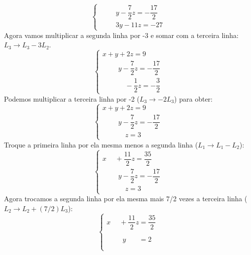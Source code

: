 \begin{exemplos}
\begin{solucao}
\begin{enumerate}
\[\begin{cases}
                                \phantom{2x +} y - \dfrac{7}{2}z = -\dfrac{17}{2}\\
                                \phantom{3x +} 3y - 11z = -27
                            \end{cases}
                        \]
                        Agora vamos multiplicar a segunda linha por -3 e somar com a terceira linha: $L_3 \to L_3 - 3L_2$.
                        \[
                            \begin{cases}
                                x + y + 2z = 9\\
                                \phantom{2x +} y - \dfrac{7}{2}z = -\dfrac{17}{2}\\
                                \phantom{3x + 3y} - \dfrac{1}{2}z = -\dfrac{3}{2}
                            \end{cases}
                        \]
                        Podemos multiplicar a terceira linha por -2 ($L_3 \to -2L_3$) para obter:
                        \[
                            \begin{cases}
                                x + y + 2z = 9\\
                                \phantom{2x +} y - \dfrac{7}{2}z = -\dfrac{17}{2}\\
                                \phantom{3x + 3y} z = 3
                            \end{cases}
                        \]
                        Troque a primeira linha por ela mesma menos a segunda linha ($L_1 \to L_1 - L_2$):
                        \[
                            \begin{cases}
                                x \phantom{ + y} + \dfrac{11}{2}z = \dfrac{35}{2}\\
                                \phantom{2x +} y - \dfrac{7}{2}z = -\dfrac{17}{2}\\
                                \phantom{3x + 3y } z = 3
                            \end{cases}
                        \]
                        Agora trocamos a segunda linha por ela mesma mais 7/2 vezes a terceira linha ($L_2 \to L_2 + (7/2)L_3$):
                        \[
                            \begin{cases}
                                x \phantom{ + y} + \dfrac{11}{2}z = \dfrac{35}{2}\\
                                \phantom{2x +} y \phantom{+ \dfrac{7}{2}z} = 2\\

\end{cases}\]
\end{enumerate}
\end{solucao}
\end{exemplos}

